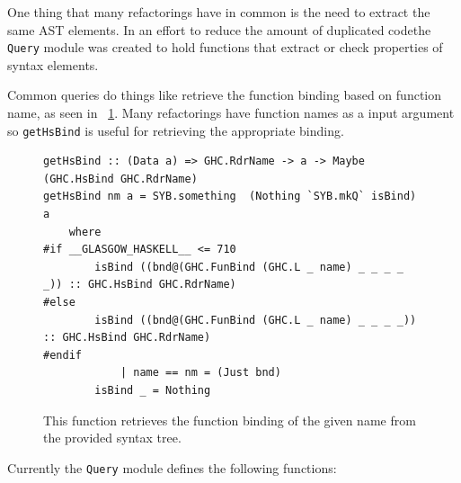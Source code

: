 One thing that many refactorings have in common is the need to extract the same AST elements. In an effort to reduce the amount of duplicated code\DIFaddbegin \DIFadd{, }\DIFaddend the \texttt{Query} module was created to hold functions that extract or check properties of syntax elements.

Common queries do things like retrieve the function binding based on function name, as seen in \DIFdelbegin {}\DIFdelend \DIFaddbegin {}\DIFaddend ~\ref{getHsBind}. Many refactorings have function names as a input argument so \texttt{getHsBind} is useful for retrieving the appropriate binding.

\begin{figure}[t]
\begin{lstlisting}
getHsBind :: (Data a) => GHC.RdrName -> a -> Maybe (GHC.HsBind GHC.RdrName)
getHsBind nm a = SYB.something  (Nothing `SYB.mkQ` isBind) a
    where
#if __GLASGOW_HASKELL__ <= 710
        isBind ((bnd@(GHC.FunBind (GHC.L _ name) _ _ _ _ _)) :: GHC.HsBind GHC.RdrName)
#else
        isBind ((bnd@(GHC.FunBind (GHC.L _ name) _ _ _ _)) :: GHC.HsBind GHC.RdrName)
#endif
            | name == nm = (Just bnd)
        isBind _ = Nothing
\end{lstlisting}
\caption{This function retrieves the function binding of the given name from the provided syntax tree.}
\label{getHsBind}
\end{figure}

Currently the \texttt{Query} module defines the following functions:

